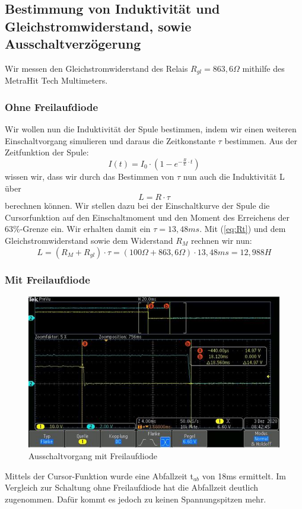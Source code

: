 \documentclass{article}
\begin{document}
\subsection{Bestimmung von Induktivität und Gleichstromwiderstand, sowie Ausschaltverzögerung}

Wir messen den Gleichstromwiderstand des Relais $R_{gl} = 863,6\Omega$ mithilfe des MetraHit Tech Multimeters.
\subsubsection{Ohne Freilaufdiode}

Wir wollen nun die Induktivität der Spule bestimmen, indem wir einen weiteren Einschaltvorgang simulieren und daraus die Zeitkonstante $\tau$ bestimmen. 
Aus der Zeitfunktion der Spule:
\begin{equation}
    I(t) = I_0 \cdot \left(1-e^{-\frac{R}{L}\cdot t}\right) 
\end{equation}
wissen wir, dass wir durch das Bestimmen von $\tau$ nun auch die Induktivität L über 
\begin{equation}\label{eq:Rt}
    L = R\cdot\tau
\end{equation}
berechnen können. Wir stellen dazu bei der Einschaltkurve der Spule die Cursorfunktion auf den Einschaltmoment und den Moment des Erreichens der 63\%-Grenze ein.
Wir erhalten damit ein $\tau = 13,48ms$. Mit (\ref{eq:Rt}) und dem Gleichstromwiderstand sowie dem Widerstand $R_M$ rechnen wir nun:
\begin{equation*}
    L = (R_M + R_{gl})\cdot \tau = (100\Omega + 863,6\Omega)\cdot 13,48ms = 12,988H
\end{equation*}

\newpage
\subsubsection{Mit Freilaufdiode}
\begin{figure}[h]
  \begin{center}
      \includegraphics[scale=0.9]{../assets/images/ET2P4/mit freilaufdiode.jpg}
      \caption{Ausschaltvorgang mit Freilaufdiode}
  \end{center}
\end{figure}
Mittels der Cursor-Funktion wurde eine Abfallzeit t$_{ab}$ von 18ms ermittelt. Im Vergleich zur Schaltung ohne Freilaufdiode hat die Abfallzeit deutlich zugenommen.
Dafür kommt es jedoch zu keinen Spannungspitzen mehr.
\end{document}
